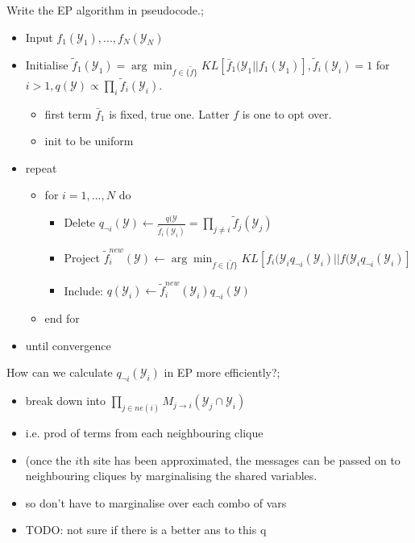 \documentclass{article}
\begin{document}
Write the EP algorithm in pseudocode.; \begin{itemize}
    \item Input $f_1(\mathcal{Y}_1), ..., f_N(\mathcal{Y}_N)$
    \item Initialise $\tilde{f}_1(\mathcal{Y}_1)=\arg\min_{f\in\{\tilde{f}\}} KL[\bar{f}_1(\mathcal{Y}_1||f_1(\mathcal{Y}_1)], \tilde{f}_i(\mathcal{Y}_i)=1$ for $i>1, q(\mathcal{Y})\propto\prod_i\tilde{f}_i(\mathcal{Y}_i)$.
    \begin{itemize}
        \item first term $\bar{f}_1$ is fixed, true one. Latter $f$ is one to opt over.
        \item init to be uniform
    \end{itemize}
    \item repeat
    \begin{itemize}
        \item for $i=1,...,N$ do
        \begin{itemize}
            \item Delete $q_{\neg i}(\mathcal{Y})\leftarrow \frac{q(\mathcal{Y}}{\tilde{f}_i(\mathcal{Y}_i)}=\prod_{j\ne i}\tilde{f}_j(\mathcal{Y}_j)$
            \item Project $\tilde{f}_i^{new}(\mathcal{Y})\leftarrow \arg\min_{f\in \{\tilde{f}\}} KL[f_i(\mathcal{Y}_iq_{\neg i}(\mathcal{Y}_i)||f(\mathcal{Y}_iq_{\neg i}(\mathcal{Y}_i)]$
            \item Include: $q(\mathcal{Y}_i)\leftarrow \tilde{f}_i^{new}(\mathcal{Y}_i)q_{\neg i}(\mathcal{Y})$
        \end{itemize}
        \item end for
    \end{itemize}
    \item until convergence
\end{itemize}

How can we calculate $q_{\neg i}(\mathcal{Y}_i)$ in EP more efficiently?; \begin{itemize}
    \item break down into $\prod_{j\in ne(i)}M_{j\rightarrow i}(\mathcal{Y}_j \cap \mathcal{Y}_i)$
    \item i.e. prod of terms from each neighbouring clique
    \item (once the $i$th site has been approximated, the messages can be passed on to neighbouring cliques by marginalising the shared variables.
    \item so don't have to marginalise over each combo of vars
    \item TODO: not sure if there is a better ans to this q
\end{itemize}
\end{document}
